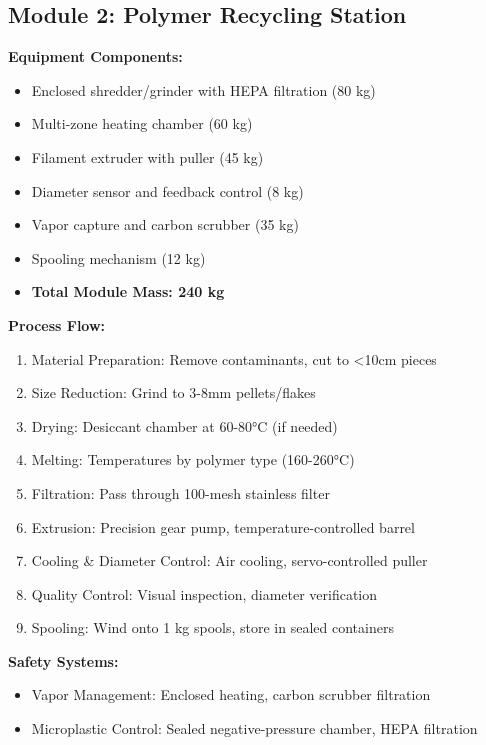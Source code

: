 \documentclass[12pt, a4paper]{article}
\begin{document}
\subsection{Module 2: Polymer Recycling Station}

\textbf{Equipment Components:}
\begin{itemize}
    \item Enclosed shredder/grinder with HEPA filtration (80 kg)
    \item Multi-zone heating chamber (60 kg)
    \item Filament extruder with puller (45 kg)
    \item Diameter sensor and feedback control (8 kg)
    \item Vapor capture and carbon scrubber (35 kg)
    \item Spooling mechanism (12 kg)
    \item \textbf{Total Module Mass: 240 kg}
\end{itemize}

\textbf{Process Flow:}
\begin{enumerate}
    \item Material Preparation: Remove contaminants, cut to <10cm pieces
    \item Size Reduction: Grind to 3-8mm pellets/flakes
    \item Drying: Desiccant chamber at 60-80°C (if needed)
    \item Melting: Temperatures by polymer type (160-260°C)
    \item Filtration: Pass through 100-mesh stainless filter
    \item Extrusion: Precision gear pump, temperature-controlled barrel
    \item Cooling \& Diameter Control: Air cooling, servo-controlled puller
    \item Quality Control: Visual inspection, diameter verification
    \item Spooling: Wind onto 1 kg spools, store in sealed containers
\end{enumerate}

\textbf{Safety Systems:}
\begin{itemize}
    \item Vapor Management: Enclosed heating, carbon scrubber filtration
    \item Microplastic Control: Sealed negative-pressure chamber, HEPA filtration
\end{itemize}
\end{document}
